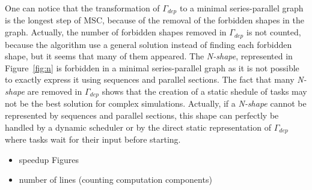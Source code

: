 
One can notice that the transformation of $\Gamma_{dep}$ to a minimal series-parallel graph is the longest step of MSC, because of the removal of the forbidden shapes in the graph. Actually, the number of forbidden shapes removed in $\Gamma_{dep}$ is not counted, because the algorithm use a general solution instead of finding each forbidden shape, but it seems that many of them appeared. The \emph{N-shape}, represented in Figure~\ref{fig:n} is forbidden in a minimal series-parallel graph as it is not possible to exactly express it using sequences and parallel sections.
The fact that many \emph{N-shape} are removed in $\Gamma_{dep}$ shows that the creation of a static shedule of tasks may not be the best solution for complex simulations. Actually, if a \emph{N-shape} cannot be represented by sequences and parallel sections, this shape can perfectly be handled by a dynamic scheduler or by the direct static representation of $\Gamma_{dep}$ where tasks wait for their input before starting.


\begin{itemize}
\item speedup Figures
\item number of lines (counting computation components)
\end{itemize}